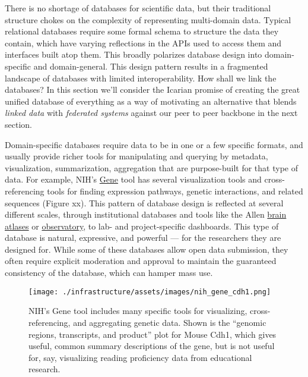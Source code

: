 There is no shortage of databases for scientific data, but their
traditional structure chokes on the complexity of representing
multi-domain data. Typical relational databases require some formal
schema to structure the data they contain, which have varying
reflections in the APIs used to access them and interfaces built atop
them. This broadly polarizes database design into domain-specific and
domain-general. This design pattern results in a
fragmented landscape of databases with limited interoperability. How
shall we link the databases? In this section we'll consider the Icarian
promise of creating the great unified database of everything as a way of
motivating an alternative that blends \emph{linked data} \citep{berners-leeLinkedData2006}  with \emph{federated systems} against our
peer to peer backbone in the next section.

Domain-specific databases require data to be in one or a few specific
formats, and usually provide richer tools for manipulating and querying
by metadata, visualization, summarization, aggregation that are
purpose-built for that type of data. For example, NIH's
\href{https://www.ncbi.nlm.nih.gov/gene/12550}{Gene} tool has several
visualization tools and cross-referencing tools for finding expression
pathways, genetic interactions, and related sequences (Figure xx). This
pattern of database design is reflected at several different scales,
through institutional databases and tools like the Allen
\href{https://connectivity.brain-map.org/}{brain atlases} or
\href{http://observatory.brain-map.org/visualcoding/}{observatory}, to
lab- and project-specific dashboards. This type of database is natural,
expressive, and powerful --- for the researchers they are designed for.
While some of these databases allow open data submission, they often
require explicit moderation and approval to maintain the guaranteed
consistency of the database, which can hamper mass use.

\begin{figure*}
\texttt{[image: ./infrastructure/assets/images/nih\_gene\_cdh1.png]}
\label{fig:genetool}
\caption{NIH's Gene tool includes many specific tools for visualizing,
cross-referencing, and aggregating genetic data. Shown is the ``genomic
regions, transcripts, and product'' plot for Mouse Cdh1, which gives
useful, common summary descriptions of the gene, but is not useful for,
say, visualizing reading proficiency data from educational research.}
\end{figure*}

